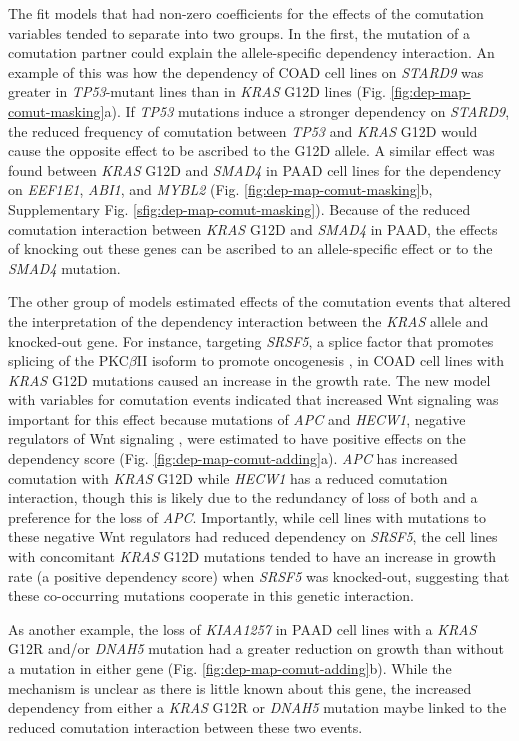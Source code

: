 \documentclass[english, 10pt, letterpaper]{article}
\newcommand{\KRAS}{\emph{KRAS}}
\begin{document}
The fit models that had non-zero coefficients for the effects of the comutation variables tended to separate into two groups.
In the first, the mutation of a comutation partner could explain the allele-specific dependency interaction.
An example of this was how the dependency of COAD cell lines on \emph{STARD9} was greater in \emph{TP53}-mutant lines than in \KRAS{} G12D lines (Fig. \ref{fig:dep-map-comut-masking}a).
If \emph{TP53} mutations induce a stronger dependency on \emph{STARD9}, the reduced frequency of comutation between \emph{TP53} and \KRAS{} G12D would cause the opposite effect to be ascribed to the G12D allele.
A similar effect was found between \KRAS{} G12D and \emph{SMAD4} in PAAD cell lines for the dependency on \emph{EEF1E1}, \emph{ABI1}, and \emph{MYBL2} (Fig. \ref{fig:dep-map-comut-masking}b, Supplementary Fig. \ref{sfig:dep-map-comut-masking}).
Because of the reduced comutation interaction between \KRAS{} G12D and \emph{SMAD4} in PAAD, the effects of knocking out these genes can be ascribed to an allele-specific effect or to the \emph{SMAD4} mutation.

The other group of models estimated effects of the comutation events that altered the interpretation of the dependency interaction between the \KRAS{} allele and knocked-out gene.
For instance, targeting \emph{SRSF5}, a splice factor that promotes splicing of the  PKC$\beta$II isoform to promote oncogenesis \cite{Gokmen-Polar2001ElevatedCarcinogenesis., Patel2005MolecularSRp40., Jiang2009Akt2Acid.}, in COAD cell lines with \KRAS{} G12D mutations caused an increase in the growth rate. 
The new model with variables for comutation events indicated that increased Wnt signaling was important for this effect because mutations of \emph{APC} and \emph{HECW1}, negative regulators of Wnt signaling \cite{Zhan2017, Tauriello2010TheRegulation.}, were estimated to have positive effects on the dependency score (Fig. \ref{fig:dep-map-comut-adding}a).
\emph{APC} has increased comutation with \KRAS{} G12D while \emph{HECW1} has a reduced comutation interaction, though this is likely due to the redundancy of loss of both and a preference for the loss of \emph{APC}.
Importantly, while cell lines with mutations to these negative Wnt regulators had reduced dependency on \emph{SRSF5}, the cell lines with concomitant \KRAS{} G12D mutations tended to have an increase in growth rate (a positive dependency score) when \emph{SRSF5} was knocked-out, suggesting that these co-occurring mutations cooperate in this genetic interaction.

As another example, the loss of \emph{KIAA1257} in PAAD cell lines with a \KRAS{} G12R and/or \emph{DNAH5} mutation had a greater reduction on growth than without a mutation in either gene (Fig. \ref{fig:dep-map-comut-adding}b).
While the mechanism is unclear as there is little known about this gene, the increased dependency from either a \KRAS{} G12R or \emph{DNAH5} mutation maybe linked to the reduced comutation interaction between these two events.
\end{document}
